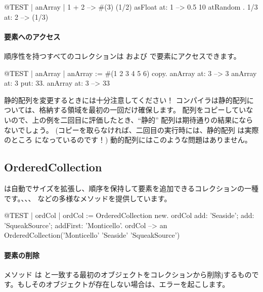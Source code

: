 \documentclass[a4paper,10pt,twoside]{book}
\begin{document}
\begin{code}{@TEST | anArray |}
{ 1 + 2 } --> #(3)
{(1/2) asFloat} at: 1 --> 0.5
{10 atRandom . 1/3} at: 2 --> (1/3)
\end{code}

\paragraph{要素へのアクセス}
順序性を持つすべてのコレクションは  および  で要素にアクセスできます。

\begin{code}{@TEST | anArray |}
anArray := #(1 2 3 4 5 6) copy.
anArray at: 3 --> 3
anArray at: 3 put: 33.
anArray at: 3 --> 33
\end{code}

\noindent
静的配列を変更するときには十分注意してください！
コンパイラは静的配列については、格納する領域を最初の一回だけ確保します。
配列をコピーしていないので、上の例を二回目に評価したとき、``静的'' 配列は期待通りの結果にならないでしょう。
(コピーを取らなければ、二回目の実行時には、静的配列  は実際のところ になっているのです！)
動的配列にはこのような問題はありません。

\subsection{OrderedCollection}
 は自動でサイズを拡張し、順序を保持して要素を追加できるコレクションの一種です。、、、 などの多様なメソッドを提供しています。

\begin{code}{@TEST | ordCol |}
ordCol := OrderedCollection new.
ordCol add: 'Seaside'; add: 'SqueakSource'; addFirst: 'Monticello'.
ordCol --> an OrderedCollection('Monticello' 'Seaside' 'SqueakSource')
\end{code}

\paragraph{要素の削除} メソッド   は  と一致する最初のオブジェクトをコレクションから削除jするものです。もしそのオブジェクトが存在しない場合は、エラーを起こします。
\end{document}
